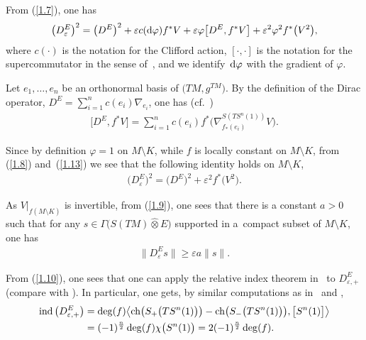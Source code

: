 \documentclass[10pt,a4paper]{amsart}
\numberwithin{equation}{section}
\theoremstyle{definition}
\begin{document}
From (\ref{1.7}), one has
\begin{gather}\label{1.8}
\big(D^E_\varepsilon\big)^2 =\big(D^E\big)^2+\varepsilon c({\rm d}\varphi) f^*V
+\varepsilon \varphi\big[D^E,f^*V\big]+\varepsilon^2\varphi^2f^*\big(V^2\big),
\end{gather}
where $c(\cdot)$ is the notation for the Clifford action, $[\cdot,\cdot]$ is the notation for the supercommutator in the sense of~\cite{Q85}, and we identify~${\rm d}\varphi$ with the gradient of $\varphi$.

Let $e_1, \dots, e_n$ be an orthonormal basis of $\big(TM,g^{TM}\big)$. By the definition of the Dirac operator, $D^E=\sum\limits_{i=1}^n c(e_i)\nabla_{e_i}$, one has (cf.~\cite{Z19})
\begin{gather}\label{1.13}
\big[D^E,f^*V\big] =\sum_{i=1}^nc (e_i ) f^* \big(\nabla^{S(TS^n(1))}_{f_*(e_i)}V\big).
\end{gather}

Since by definition $\varphi=1$ on $M\setminus K$, while $f$ is locally constant on $M\setminus K $, from (\ref{1.8}) and~(\ref{1.13}) we see that the following identity holds on $M\setminus K$,
\begin{gather}\label{1.9}
\big(D^E_\varepsilon\big)^2 =\big(D^E\big)^2 +\varepsilon^2 f^*\big(V ^2\big).
\end{gather}

As $V|_{ {f(M\setminus K)}}$ is invertible, from (\ref{1.9}), one sees that there is a constant $a>0$ such that for any $s\in \Gamma\big(S(TM)\widehat\otimes E\big)$ supported in a~compact subset of $M\setminus K$, one has
\begin{gather}\label{1.10}
\big\|D^E_\varepsilon s\big\| \geq \varepsilon a \|s\|.
\end{gather}

 From (\ref{1.10}), one sees that one can apply the relative index theorem in~\cite{GL83} to $D^E_{\varepsilon,+}$ (compare with \cite[Section~6$\frac{4}{5}$]{Gr96}). In particular, one gets, by similar computations as in~\cite{GL83} and \cite[Proposition~III.11.24]{LaMi89},
\begin{align}
\operatorname{ind}\big(D^E_{\varepsilon,+}\big)
&= \deg (f)\big\langle {\rm ch}\big(S_+\big(TS^n(1)\big)\big) -
 {\rm ch}\big(S_-\big(TS^n(1)\big)\big),\big[S^n(1)\big]\big\rangle
\nonumber\\
& =(-1)^{\frac{n}{2}}\deg (f) \chi\big(S^n(1)\big)
 =2(-1)^{\frac{n}{2}}\deg (f) .\label{1.11}
\end{align}
\end{document}
